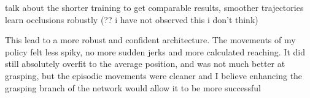 talk about the shorter training to get comparable results, smoother trajectories learn occlusions robustly (?? i have not observed this i don't think)


This lead to a more robust and confident architecture. The movements of my policy felt less spiky, no more sudden jerks and more calculated reaching. It did still absolutely overfit to the average position, and was not much better at grasping, but the episodic movements were cleaner and I believe enhancing the grasping branch of the network would allow it to be more successful 